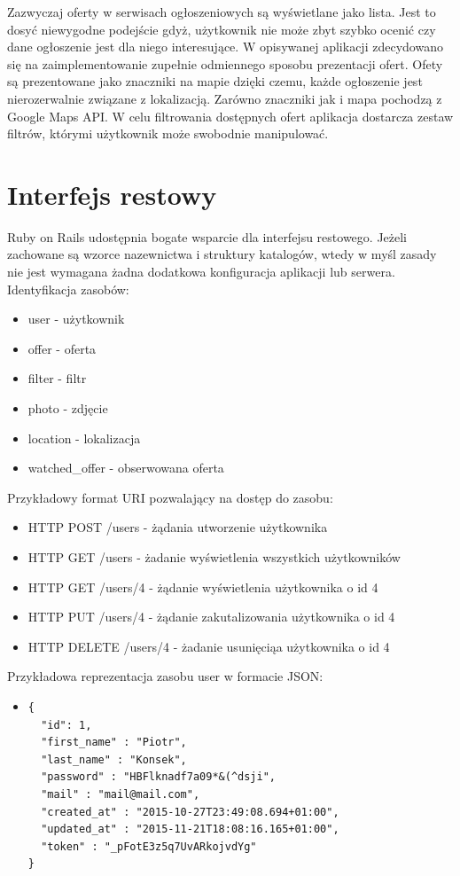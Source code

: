 Zazwyczaj oferty w serwisach ogłoszeniowych są wyświetlane jako lista. Jest to dosyć niewygodne podejście gdyż, użytkownik nie może zbyt szybko ocenić czy dane ogłoszenie jest dla niego interesujące. W opisywanej aplikacji zdecydowano się na zaimplementowanie zupełnie odmiennego sposobu prezentacji ofert. Ofety są prezentowane jako znaczniki na mapie dzięki czemu, każde ogłoszenie jest nierozerwalnie związane z lokalizacją. Zarówno znaczniki jak i mapa pochodzą z Google Maps API. W celu filtrowania dostępnych ofert aplikacja dostarcza zestaw filtrów, którymi użytkownik może swobodnie manipulować. 

\section{Interfejs restowy}
\label{sec:interfejsRestowy}
Ruby on Rails udostępnia bogate wsparcie dla interfejsu restowego. Jeżeli zachowane są wzorce nazewnictwa i struktury katalogów, wtedy w myśl zasady  nie jest wymagana żadna dodatkowa konfiguracja aplikacji lub serwera.\\
Identyfikacja zasobów:
\begin{itemize}
\item user - użytkownik
\item offer - oferta
\item filter - filtr
\item photo - zdjęcie
\item location - lokalizacja
\item watched\_offer - obserwowana oferta
\end{itemize}
Przykładowy format URI pozwalający na dostęp do zasobu:
\begin{itemize}
\item HTTP POST /users - żądania utworzenie użytkownika
\item HTTP GET /users - żadanie wyświetlenia wszystkich użytkowników
\item HTTP GET /users/4 - żądanie wyświetlenia użytkownika o id 4
\item HTTP PUT /users/4 - żądanie zakutalizowania użytkownika o id 4
\item HTTP DELETE /users/4 - żadanie usunięciąa użytkownika o id 4
\end{itemize}
Przykładowa reprezentacja zasobu user w formacie JSON:
\begin{itemize}
\item \begin{lstlisting}
{
  "id": 1,
  "first_name" : "Piotr",
  "last_name" : "Konsek",
  "password" : "HBFlknadf7a09*&(^dsji",
  "mail" : "mail@mail.com",
  "created_at" : "2015-10-27T23:49:08.694+01:00",
  "updated_at" : "2015-11-21T18:08:16.165+01:00",
  "token" : "_pFotE3z5q7UvARkojvdYg"
}
\end{lstlisting}
\end{itemize}

